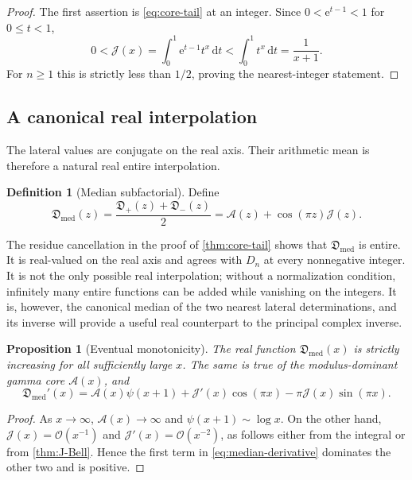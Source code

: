 \documentclass[11pt,a4paper]{article}
\numberwithin{equation}{section}
\newtheorem{proposition}[theorem]{Proposition}
\theoremstyle{definition}
\newtheorem{definition}[theorem]{Definition}
\theoremstyle{remark}
\newcommand{\e}{\mathrm e}
\newcommand{\dd}{\,\mathrm d}
\newcommand{\Ord}{\mathcal O}
\newcommand{\Sub}{\mathfrak D}
\newcommand{\Core}{\mathcal A}
\newcommand{\Tail}{\mathcal J}
\newcommand{\med}{\mathrm{med}}
\begin{document}
\begin{proof}
The first assertion is \eqref{eq:core-tail} at an integer.  Since
$0<\e^{t-1}<1$ for $0\le t<1$,
\[
 0<\Tail(x)=\int_0^1\e^{t-1}t^x\dd t
 <\int_0^1t^x\dd t=\frac1{x+1}.
\]
For $n\ge1$ this is strictly less than $1/2$, proving the nearest-integer
statement.
\end{proof}

\subsection{A canonical real interpolation}

The lateral values are conjugate on the real axis.  Their arithmetic mean
is therefore a natural real entire interpolation.

\begin{definition}[Median subfactorial]\label{def:median}
Define
\begin{equation}\label{eq:median-def}
 \Sub_{\med}(z)=\frac{\Sub_+(z)+\Sub_-(z)}2
 =\Core(z)+\cos(\pi z)\Tail(z).
\end{equation}
\end{definition}

The residue cancellation in the proof of \cref{thm:core-tail} shows that
$\Sub_{\med}$ is entire.  It is real-valued on the real axis and agrees with
$D_n$ at every nonnegative integer.  It is not the only possible real
interpolation; without a normalization condition, infinitely many entire
functions can be added while vanishing on the integers.  It is, however, the
canonical median of the two nearest lateral determinations, and its inverse
will provide a useful real counterpart to the principal complex inverse.

\begin{proposition}[Eventual monotonicity]\label{prop:eventual-mono}
The real function $\Sub_{\med}(x)$ is strictly increasing for all sufficiently
large $x$.  The same is true of the modulus-dominant gamma core
$\Core(x)$, and
\begin{equation}\label{eq:median-derivative}
 \Sub_{\med}'(x)
 =\Core(x)\psi(x+1)
 +\Tail'(x)\cos(\pi x)-\pi\Tail(x)\sin(\pi x).
\end{equation}
\end{proposition}

\begin{proof}
As $x\to\infty$, $\Core(x)\to\infty$ and
$\psi(x+1)\sim\log x$.  On the other hand,
$\Tail(x)=\Ord(x^{-1})$ and $\Tail'(x)=\Ord(x^{-2})$, as follows either
from the integral or from \cref{thm:J-Bell}.  Hence the first term in
\eqref{eq:median-derivative} dominates the other two and is positive.
\end{proof}
\end{document}
